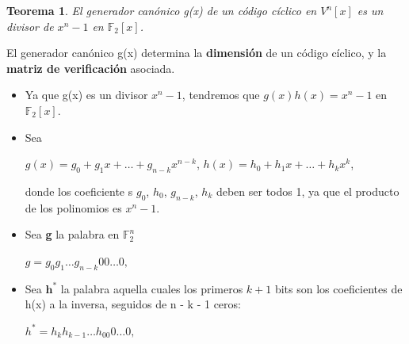 \documentclass{beamer}
\theoremstyle{plain}
\newtheorem{teorema} [Teorema] {Teorema}
\theoremstyle{example}
\theoremstyle{example}
\begin{document}
\begin{frame}  \small  

\begin{teorema}\label{te:GeneradorCanonico}
El generador canónico g(x) de un código cíclico en $V^n[x]$ es un divisor de $x^n -1$ en $\mathbb{F}_2[x]$.
\end{teorema}

El generador canónico g(x) determina la \textbf{dimensión} de un código cíclico, y la \textbf{matriz de verificación} asociada.

\footnotesize
\begin{itemize} 

\item   Ya que  g(x) es un divisor $x^n-1$, tendremos que $g(x)h(x) = x^n-1$ en $\mathbb{F}_2[x]$.


\item Sea

\begin{center}
$g(x)=g_0 +g_1x+\ldots +g_{n-k} x^{n-k}$,	$h(x)=h_0 +h_1x+\ldots+h_kx^k$,
\end{center}

donde los coeficiente s $g_0$, $h_0$, $g_{n-k}$, $h_k$ deben ser todos 1, ya que el producto de los polinomios es $x^n - 1$. 

\item Sea \textbf{g} la palabra en $\mathbb{F}_2^n$

\begin{center}
$g = g_0 g_1 \ldots g_{n-k}0 0\ldots 0,$
\end{center}

\item Sea $\mathbf{h^*}$ la palabra aquella cuales los primeros $k+1$ bits son los coeficientes de h(x) a la inversa, seguidos de n - k - 1 ceros:

\begin{center}
$h^* = h_k h_{k-1} \ldots h_00 0\ldots 0,$
\end{center}

\end{itemize} \end{frame} 
\end{document}
